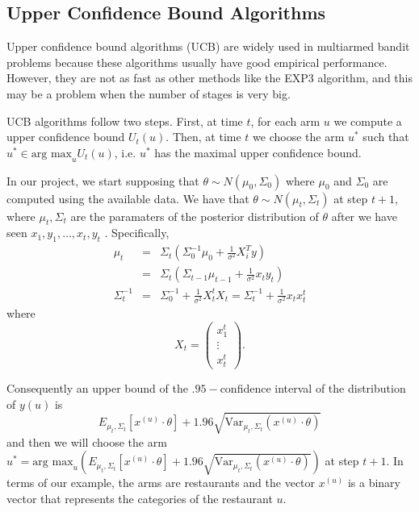 \documentclass{article}
\theoremstyle{plain}
\theoremstyle{definition}
\begin{document}
\subsection{Upper Confidence Bound Algorithms}

Upper confidence bound algorithms (UCB) are widely used in multiarmed
bandit problems because these algorithms usually have good empirical performance. 
However, they are not as fast as other methods like the EXP3 algorithm, and this may be a problem
when the number of stages is very big.

UCB algorithms follow two steps. First, at time $t$, for each arm
$u$ we compute a upper confidence bound $U_{t}\left(u\right)$. Then,
at time $t$ we choose the arm $u^{*}$ such that $u^{*}\in\mbox{arg max}_{u}U_{t}\left(u\right)$,
i.e. $u^{*}$ has the maximal upper confidence bound. 

In our project, we start supposing that $\theta\sim N\left(\mu_{0},\Sigma_{0}\right)$
where $\mu_{0}$ and $\Sigma_{0}$ are computed using the available
data. We have that $\theta\sim N\left(\mu_{t},\Sigma_{t}\right)$
at step $t+1$, where $\mu_{t},\Sigma_{t}$ are the paramaters of
the posterior distribution of $\theta$ after we have seen $x_{1},y_{1},\ldots,x_{t},y_{t}$
. Specifically,
\begin{eqnarray*}
\mu_{t} & = & \Sigma_{t}\left(\Sigma_{0}^{-1}\mu_{0}+\frac{1}{\sigma^{2}}X_{i}^{T}y\right)\\
 & = & \Sigma_{t}\left(\Sigma_{t-1}\mu_{t-1}+\frac{1}{\sigma^{2}}x_{t}y_{t}\right)\\
\Sigma_{t}^{-1} & = & \Sigma_{0}^{-1}+\frac{1}{\sigma^{2}}X_{t}^{t}X_{t}=\Sigma_{t}^{-1}+\frac{1}{\sigma^{2}}x_{t}x_{t}^{t}
\end{eqnarray*}
where 
\[
X_{t}=\left(\begin{array}{c}
x_{1}^{t}\\
\vdots\\
x_{t}^{t}
\end{array}\right).
\]


Consequently an upper bound of the $.95-$confidence interval of the distribution
of $y\left(u\right)$ is 
\[
E_{\mu_{t},\Sigma_{t}}\left[x^{\left(u\right)}\cdot\theta\right]+1.96\sqrt{\mbox{Var}_{\mu_{t},\Sigma_{t}}\left(x^{\left(u\right)}\cdot\theta\right)}
\]
and then we will choose the arm $u^{*}=\mbox{arg max}_{u}\left(E_{\mu_{t},\Sigma_{t}}\left[x^{\left(u\right)}\cdot\theta\right]+1.96\sqrt{\mbox{Var}_{\mu_{t},\Sigma_{t}}\left(x^{\left(u\right)}\cdot\theta\right)}\right)$
at step $t+1$. In terms of our example, the arms are restaurants
and the vector $x^{\left(u\right)}$ is a binary vector that represents
the categories of the restaurant $u$.
\end{document}
